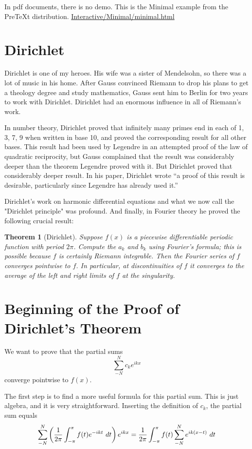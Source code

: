 \documentclass[11pt, oneside]{article}   	%
\newtheorem{theorem}{Theorem}
\begin{document}
\ifx\HCode\underined
In pdf documents, there is no demo.
\else
This is the Minimal example from the PreTeXt distribution. \url{Interactive/Minimal/minimal.html}
\fi

\section{Dirichlet}

Dirichlet is one of my heroes. His wife was a sister of Mendelsohn, so there was a lot of music in his home. After Gauss convinced Riemann to drop his plans to get a theology degree and  study mathematics, Gauss  sent him to Berlin for two years to work with Dirichlet. Dirichlet had an enormous influence in all of Riemann's work. 

In number theory, Dirichlet proved that infinitely many primes end in each of 1, 3, 7, 9 when written in base 10, and proved the corresponding result for all other bases. This result had been used by Legendre in an attempted proof of the law of quadratic reciprocity, but Gauss complained that the result was considerably deeper than the theorem Legendre proved with it. But Dirichlet proved that considerably deeper result. In his paper, Dirichlet wrote ``a proof of this result is desirable, particularly since Legendre has already used it.''

Dirichlet's work on harmonic differential equations and what we now call the "Dirichlet principle" was profound. And  finally, in Fourier theory he proved the following crucial result:

\begin{theorem}[Dirichlet]
Suppose $f(x)$ is a piecewise differentiable periodic function with period $2 \pi$. Compute the $a_k$ and $b_k$ using Fourier's formula; this is possible because $f$ is certainly Riemann integrable. Then the Fourier series of $f$ converges pointwise to $f$. In particular, at discontinuities of $f$ it converges to the average of the left and right limits of $f$ at the singularity.
\end{theorem}



\section{Beginning of the Proof of Dirichlet's Theorem}


We want to prove that the partial sums
\[\sum_{-N}^N c_k e^{ikx}\]
converge pointwise to $f(x)$.

The first step is to find a more useful formula for this partial sum. This is just algebra, and it is very straightforward. Inserting the definition of $c_k$, the partial sum equals
\[\sum_{-N}^N \left({1 \over {2 \pi}} \int_{- \pi}^\pi  f(t) e^{-ikt} \ dt\right) e^{ikx} = {1 \over {2 \pi}} \int_{- \pi}^\pi f(t) \sum_{-N}^N e^{i k (x - t)} \ dt\]
\end{document}
